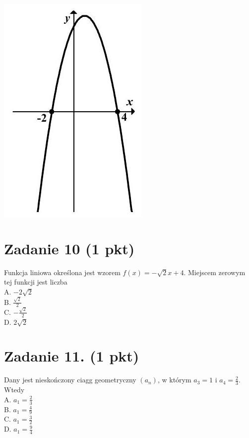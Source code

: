 \documentclass[10pt]{article}
\begin{document}
\includegraphics[max width=\textwidth, center]{2024_11_21_5b6b7ffa9006e3f448adg-04(1)}

\section*{Zadanie 10 (1 pkt)}
Funkcja liniowa określona jest wzorem \(f(x)=-\sqrt{2} x+4\). Miejscem zerowym tej funkcji jest liczba\\
A. \(-2 \sqrt{2}\)\\
B. \(\frac{\sqrt{2}}{2}\)\\
C. \(-\frac{\sqrt{2}}{2}\)\\
D. \(2 \sqrt{2}\)

\section*{Zadanie 11. (1 pkt)}
Dany jest nieskończony ciagg geometryczny \(\left(a_{n}\right)\), w którym \(a_{3}=1\) i \(a_{4}=\frac{2}{3}\). Wtedy\\
A. \(a_{1}=\frac{2}{3}\)\\
B. \(a_{1}=\frac{4}{9}\)\\
C. \(a_{1}=\frac{3}{2}\)\\
D. \(a_{1}=\frac{9}{4}\)
\end{document}

